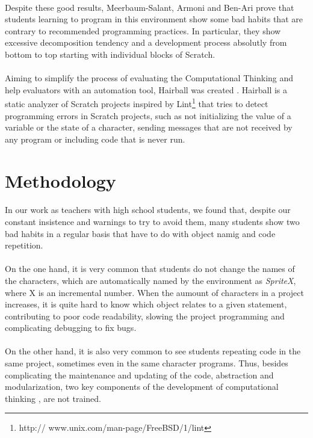 \documentclass[a4paper,10pt]{article}
\begin{document}
\paragraph{}Despite these good results, Meerbaum-Salant, Armoni and Ben-Ari \cite{meerbaum2011habits} prove that students learning to program in this environment show some bad habits that are contrary to recommended programming practices. In particular, they show excessive decomposition tendency and a development process absolutly from bottom to top starting with individual blocks of Scratch.
\paragraph{} Aiming to simplify the process of evaluating the Computational Thinking and help evaluators with an automation tool, Hairball was created \cite{boe2013hairball}. Hairball is a static analyzer of Scratch projects inspired by Lint\footnote{http:// www.unix.com/man-page/FreeBSD/1/lint} that tries to detect programming errors in Scratch projects, such as not initializing the value of a variable or the state of a character, sending messages that are not received by any program or including code that is never run.

\section{Methodology}

\paragraph{}In our work as teachers with high school students, we found that, despite our constant insistence and warnings to try to avoid them, many students show two bad habits in a regular basis that have to do with object namig and code repetition.

\paragraph{}On the one hand, it is very common that students do not change the names of the characters, which are automatically named by the environment as \textit{SpriteX}, where X is an incremental number. When the aumount of characters in a project increases, it is quite hard to know which object relates to a given statement, contributing to poor code readability, slowing the project programming and complicating debugging to fix bugs.
\paragraph{}On the other hand, it is also very common to see students repeating code in the same project, sometimes even in the same character programs. Thus, besides complicating the maintenance and updating of the code, abstraction and modularization, two key components of the development of computational thinking \cite{wing2008computational}, are not trained.
\end{document}
